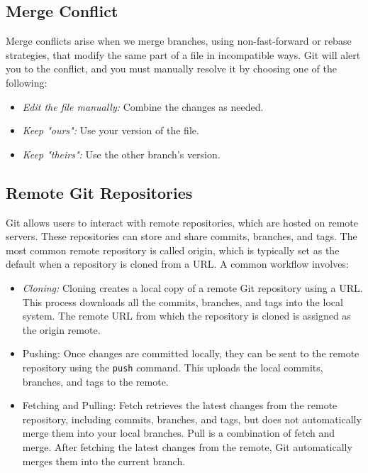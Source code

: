 \subsection*{Merge Conflict}
Merge conflicts arise when we merge branches, using non-fast-forward or rebase strategies, that modify the same part of a file in incompatible ways. Git will alert you to the conflict, and you must manually resolve it by choosing one of the following:
\begin{itemize}
    \item \textit{Edit the file manually:} Combine the changes as needed.
    \item \textit{Keep "ours":} Use your version of the file.
    \item \textit{Keep "theirs":} Use the other branch’s version.
\end{itemize}

\subsection*{Remote Git Repositories}
Git allows users to interact with remote repositories, which are hosted on remote servers. These repositories can store and share commits, branches, and tags. The most common remote repository is called origin, which is typically set as the default when a repository is cloned from a URL. A common workflow involves:
\begin{itemize}
    \item \textit{Cloning:} Cloning creates a local copy of a remote Git repository using a URL. This process downloads all the commits, branches, and tags into the local system. The remote URL from which the repository is cloned is assigned as the origin remote.
    \item Pushing: Once changes are committed locally, they can be sent to the remote repository using the \texttt{push} command. This uploads the local commits, branches, and tags to the remote.
    \item Fetching and Pulling: Fetch retrieves the latest changes from the remote repository, including commits, branches, and tags, but does not automatically merge them into your local branches. Pull is a combination of fetch and merge. After fetching the latest changes from the remote, Git automatically merges them into the current branch.
\end{itemize}

